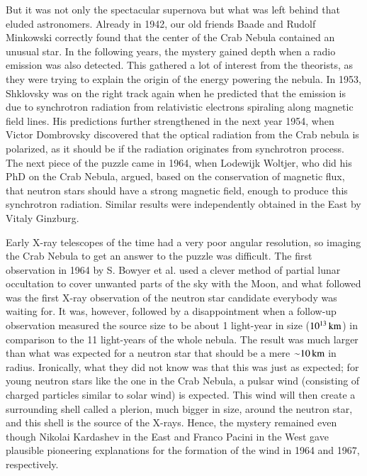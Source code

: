 But it was not only the spectacular supernova but what was left behind that eluded astronomers.
Already in 1942, our old friends Baade and Rudolf Minkowski correctly found that the center of the Crab Nebula contained an unusual star.\cite{Baade42, Minkowski42}
In the following years, the mystery gained depth when a radio emission was also detected.\cite{BSS49}
This gathered a lot of interest from the theorists, as they were trying to explain the origin of the energy powering the nebula.
In 1953, Shklovsky was on the right track again when he predicted that the emission is due to synchrotron radiation from relativistic electrons spiraling along magnetic field lines. 
His predictions  further strengthened in the next year 1954, when Victor Dombrovsky discovered that the optical radiation from the Crab nebula is polarized,\cite{Dombrovsky54} as it should be if the radiation originates from synchrotron process.
The next piece of the puzzle came in 1964, when Lodewijk Woltjer, who did his PhD on the Crab Nebula, argued, based on the conservation of magnetic flux, that neutron stars should have a strong magnetic field, enough to produce this synchrotron radiation.\cite{Woltjer64}
Similar results were independently obtained in the East by Vitaly Ginzburg.\cite{Ginzburg64}


Early X-ray telescopes of the time had a very poor angular resolution, so imaging the Crab Nebula to get an answer to the puzzle was difficult.
The first observation in 1964 by S. Bowyer et al. used a clever method of partial lunar occultation to cover unwanted parts of the sky with the Moon, and what followed was the first X-ray observation of the neutron star candidate everybody was waiting for.\cite{BBC64a}
It was, however, followed by a disappointment when a follow-up observation measured the source size to be about 1 light-year in size ($10^{13}\, \mathrm{km}$) in comparison to the 11 light-years of the whole nebula.\cite{BBC64b}
The result was much larger than what was expected for a neutron star that should be a mere $\mathord{\sim} 10\, \mathrm{km}$ in radius.
Ironically, what they did not know was that this was just as expected;
for young neutron stars like the one in the Crab Nebula, a pulsar wind (consisting of charged particles similar to solar wind) is expected. 
This wind will then create a surrounding shell called a plerion, much bigger in size, around the neutron star, and this shell is the source of the X-rays.
Hence, the mystery remained even though Nikolai Kardashev in the East and Franco Pacini in the West gave plausible pioneering explanations for the formation of the wind in 1964 and 1967, respectively.\cite{Kardashev64, Pacini67}


